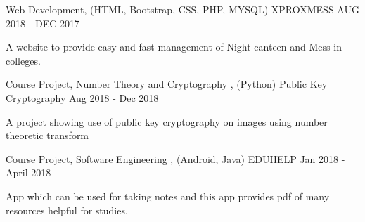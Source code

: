 \documentclass[11pt, a4paper]{awesome-cv}
\begin{document}


\begin{cventries}

  \cventry
    {Web Development, (HTML, Bootstrap, CSS, PHP, MYSQL)} %
    {XPROXMESS} %
    {} %
    {AUG 2018 - DEC 2017} %
    {
      \begin{cvitems} %
        \item {A website to provide easy and fast management of Night canteen and Mess in colleges.}
      \end{cvitems}
    }

\end{cventries}

\begin{cventries}

  \cventry
    {Course Project, Number Theory and Cryptography , (Python) } %
    {Public Key Cryptography} %
    {} %
    {Aug 2018 - Dec 2018} %
    {
      \begin{cvitems} %
        \item {A project showing use of public key cryptography on images using number theoretic transform}
      \end{cvitems}
    }

\end{cventries}

\begin{cventries}

  \cventry
    {Course Project, Software Engineering , (Android, Java) } %
    {EDUHELP} %
    {} %
    {Jan 2018 - April 2018} %
    {
      \begin{cvitems} %
        \item {App which can be used for taking notes and this app
provides pdf of many resources helpful for studies.}
      \end{cvitems}
    }

\end{cventries}
\end{document}
